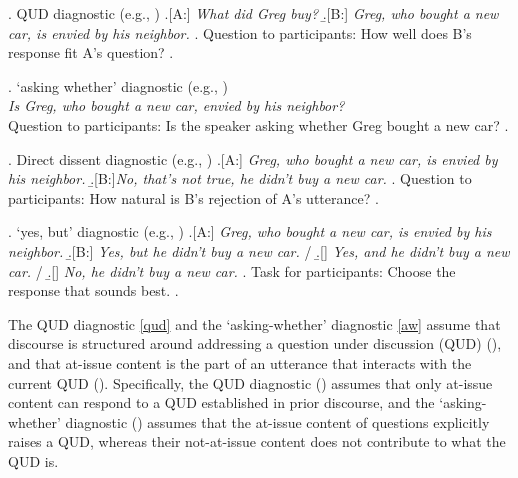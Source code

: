 \documentclass[times,linguex,xcolor]{glossa}
\begin{document}
    \ex. \label{qud}%
      QUD diagnostic (e.g., \citealt{tonhauser_diagnosing_2012,chen_presuppositions_2024})
      \a.[A:] \emph{What did Greg buy?}
      \b.[B:] \emph{Greg, who bought a new car, is envied by his neighbor.}
      \z.
      Question to participants: How well does B's response fit A's question?
    \z.

    \ex. \label{aw}%
      `asking whether' diagnostic (e.g., \citealt{tonhauser_how_2018,solstad_cataphoric_2024})\smallskip\\
        \emph{Is Greg, who bought a new car, envied by his neighbor?}\smallskip
    \\ Question to participants: Is the speaker asking whether Greg bought a new car?
    \z.

    \ex. \label{dd} Direct dissent diagnostic (e.g., \citealt{tonhauser_diagnosing_2012,syrett_experimental_2015})
      \a.[A:] \emph{Greg, who bought a new car, is envied by his neighbor.}
      \b.[B:]\emph{No, that's not true, he didn't buy a new car.}
      \z.
    Question to participants: How natural is B's rejection of A's utterance?
    \z.

    \ex. \label{yesbut}%
      `yes, but' diagnostic (e.g., \citealt{xue_correlation_2011,destruel_cross-linguistic_2015})
      \a.[A:] \emph{Greg, who bought a new car, is envied by his neighbor.}
      \b.[B:] \emph{Yes, but he didn't buy a new car.} /
      \b.[] \emph{Yes, and he didn't buy a new car.} /
      \b.[] \emph{No, he didn't buy a new car.}
      \z.
      Task for participants: Choose the response that sounds best.
    \z.

    The QUD diagnostic \ref{qud} and the ‘asking-whether’ diagnostic \ref{aw} assume that discourse is structured around addressing a question under discussion (QUD) (\citealt{roberts_information_1996,ginzburg_interrogatives_1996}), and that at-issue content is the part of an utterance that interacts with the current QUD (\citealt{amaral_review_2007,simons_what_2010}). Specifically, the QUD diagnostic (\citealt{tonhauser_diagnosing_2012}) assumes that only at-issue content can respond to a QUD established in prior discourse, and the ‘asking-whether’ diagnostic (\citealt{tonhauser_how_2018}) assumes that the at-issue content of questions explicitly raises a QUD, whereas their not-at-issue content does not contribute to what the QUD is.
\end{document}
